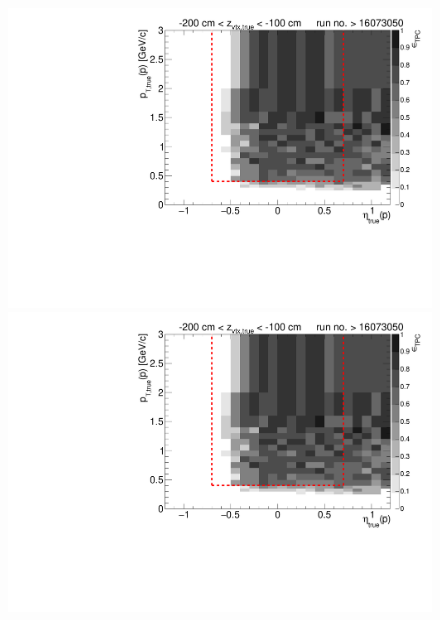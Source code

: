 \begin{figure}[hb]
{		\includegraphics[width=\linewidth,page=16]{graphics/eff/Eff2D_TPC_proton_Minus_RunRange2.pdf}\\
		\includegraphics[width=\linewidth,page=18]{graphics/eff/Eff2D_TPC_proton_Minus_RunRange2.pdf}
	}%
\end{figure}



